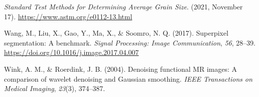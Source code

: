 \documentclass[
  12pt,
]{book}
\newlength{\cslhangindent}
\newlength{\cslentryspacingunit} %
\newenvironment{CSLReferences}[2] %
 {%
  \setlength{\parindent}{0pt}
  \ifodd #1
  \let\oldpar\par
  \def\par{\hangindent=\cslhangindent\oldpar}
  \fi
  \setlength{\parskip}{#2\cslentryspacingunit}
 }%
 {}
\begin{document}
\begin{CSLReferences}{1}{0}
\leavevmode{}%
\emph{Standard {Test Methods} for {Determining Average Grain Size}}. (2021, November 17). \url{https://www.astm.org/e0112-13.html}

\leavevmode{}%
Wang, M., Liu, X., Gao, Y., Ma, X., \& Soomro, N. Q. (2017). Superpixel segmentation: {A} benchmark. \emph{Signal Processing: Image Communication}, \emph{56}, 28--39. \url{https://doi.org/10.1016/j.image.2017.04.007}

\leavevmode{}%
Wink, A. M., \& Roerdink, J. B. (2004). Denoising functional {MR} images: A comparison of wavelet denoising and {Gaussian} smoothing. \emph{IEEE Transactions on Medical Imaging}, \emph{23}(3), 374--387.

\end{CSLReferences}
\end{document}
